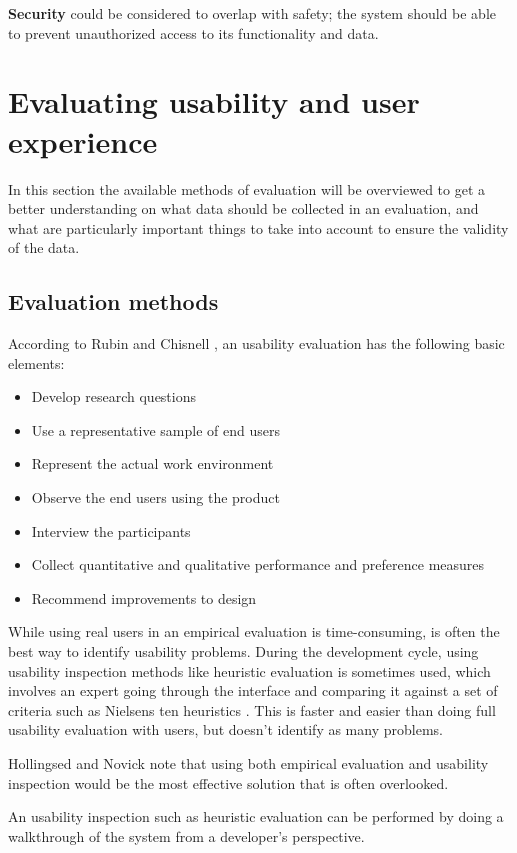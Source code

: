 \textbf{Security} could be considered to overlap with safety; the system should be able to prevent unauthorized access to its functionality and data. \cite{abran2003usability}

\section{Evaluating usability and user experience}
In this section the available methods of evaluation will be overviewed to get a better understanding on what data should be collected in an evaluation, and what are particularly important things to take into account to ensure the validity of the data.

\subsection{Evaluation methods}
According to Rubin and Chisnell \cite{rubin2008handbook}, an usability evaluation has the following basic elements:
\begin{itemize}
\item Develop research questions
\item Use a representative sample of end users
\item Represent the actual work environment
\item Observe the end users using the product
\item Interview the participants
\item Collect quantitative and qualitative performance and preference measures
\item Recommend improvements to design
\end{itemize}

While using real users in an empirical evaluation is time-consuming, is often the best way to identify usability problems. During the development cycle, using usability inspection methods like heuristic evaluation is sometimes used, which involves an expert going through the interface and comparing it against a set of criteria such as Nielsens ten heuristics \cite{Solr-oula.410573, nielsen1995usability}. This is faster and easier than doing full usability evaluation with users, but doesn't identify as many problems.

Hollingsed and Novick \cite{hollingsed2007usability} note that using both empirical evaluation and usability inspection would be the most effective solution that is often overlooked.

An usability inspection such as heuristic evaluation can be performed by doing a walkthrough of the system from a developer's perspective.

